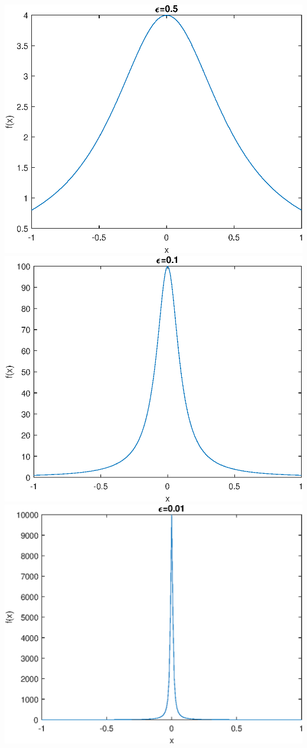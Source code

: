 \documentclass{article}
\begin{document}
\includegraphics[scale=0.55]{real2.eps}
\includegraphics[scale=0.55]{real3.eps}
\includegraphics[scale=0.55]{real4.eps}\\
\end{document}
